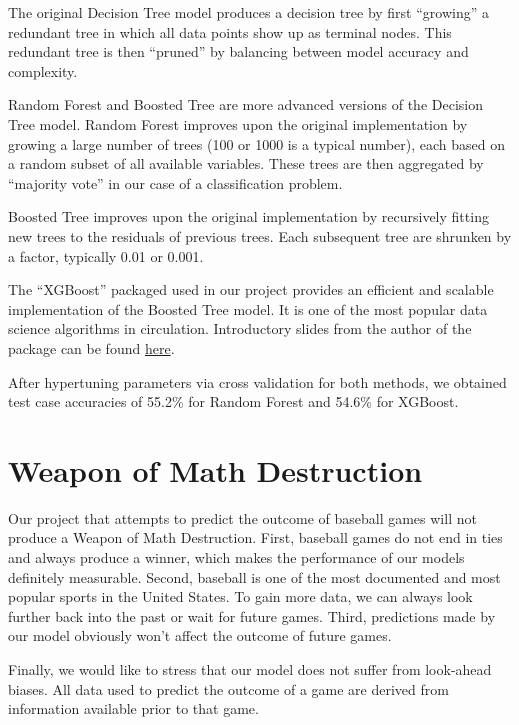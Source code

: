 \documentclass[12pt,onecolumn]{article}
\begin{document}
\noindent
The original Decision Tree model produces a decision tree by first “growing” a redundant tree in which all data points show up as terminal nodes. This redundant tree is then “pruned” by balancing between model accuracy and complexity. \vspace*{4mm}

\noindent
Random Forest and Boosted Tree are more advanced versions of the Decision Tree model. Random Forest improves upon the original implementation by growing a large number of trees (100 or 1000 is a typical number), each based on a random subset of all available variables. These trees are then aggregated by “majority vote” in our case of a classification problem. \vspace*{4mm}

\noindent
Boosted Tree improves upon the original implementation by recursively fitting new trees to the residuals of previous trees. Each subsequent tree are shrunken by a factor, typically 0.01 or 0.001. \vspace*{4mm}

\noindent
The “XGBoost” packaged used in our project provides an efficient and scalable implementation of the Boosted Tree model. It is one of the most popular data science algorithms in circulation. Introductory slides from the author of the package can be found \href{https://homes.cs.washington.edu/~tqchen/pdf/BoostedTree.pdf}{here}. \vspace*{4mm}

\noindent
After hypertuning parameters via cross validation for both methods, we obtained test case accuracies of 55.2\% for Random Forest and 54.6\% for XGBoost.

\section*{Weapon of Math Destruction}
Our project that attempts to predict the outcome of baseball games will not produce a Weapon of Math Destruction. First, baseball games do not end in ties and always produce a winner, which makes the performance of our models definitely measurable. Second, baseball is one of the most documented and most popular sports in the United States. To gain more data, we can always look further back into the past or wait for future games. Third, predictions made by our model obviously won’t affect the outcome of future games. \vspace*{4mm}

\noindent
Finally, we would like to stress that our model does not suffer from look-ahead biases. All data used to predict the outcome of a game are derived from information available prior to that game.
\end{document}
